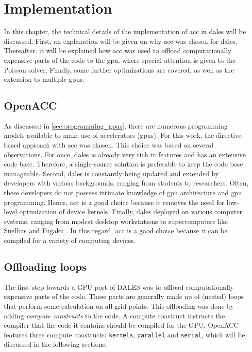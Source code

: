 \chapter{Implementation}
In this chapter, the technical details of the implementation of \acrshort{acc} in \acrshort{dales} will be discussed. First, an explanation will be given on why \acrshort{acc} was chosen for \acrshort{dales}. Thereafter, it will be explained how \acrshort{acc} was used to offload computationally expensive parts of the code to the \acrshort{gpu}, where special attention is given to the Poisson solver. Finally, some further optimizations are covered, as well as the extension to multiple \acrshort{gpu}s.

\section{OpenACC}
As discussed in \autoref{sec:programming_gpus}, there are numerous programming models available to make use of accelerators (\acrshort{gpu}s). For this work, the directive-based approach with \acrshort{acc} was chosen. This choice was based on several observations. For once, \acrshort{dales} is already very rich in features and has an extensive code base. Therefore, a single-source solution is preferable to keep the code base manageable. Second, \acrshort{dales} is constantly being updated and extended by developers with various backgrounds, ranging from students to researchers. Often, these developers do not possess intimate knowledge of \acrshort{gpu} architecture and \acrshort{gpu} programming. Hence, \acrshort{acc} is a good choice because it removes the need for low-level optimization of device kernels. Finally, \acrshort{dales} deployed on various computer systems, ranging from modest desktop workstations to supercomputers like Snellius and Fugaku \citep{janssonCloudBotanyShallow2023}. In this regard, \acrshort{acc} is a good choice because it can be compiled for a variety of computing devices.

\section{Offloading loops}
The first step towards a GPU port of DALES was to offload computationally expensive parts of the code. These parts are generally made up of (nested) loops that perform some calculation on all grid points. This offloading was done by adding \emph{compute constructs} to the code. A compute construct instructs the compiler that the code it contains should be compiled for the GPU. OpenACC features three compute constructs: \texttt{kernels}, \texttt{parallel} and \texttt{serial}, which will be discussed in the following sections. 

